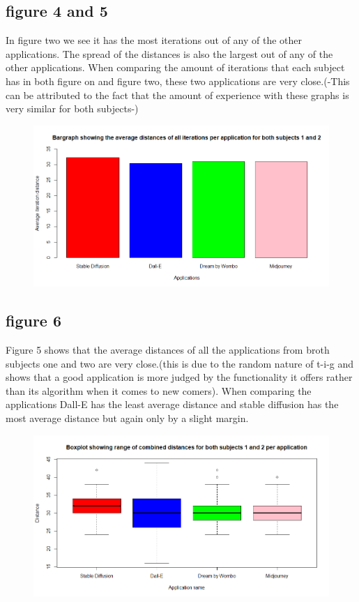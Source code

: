 \documentclass[]{report}
\begin{document}
\subsection{figure 4 and 5}

In figure two we see it has the most iterations out of any of the other applications. The spread of the distances is also the largest out of any of the other applications. When comparing the amount of iterations that each subject has in both figure on and figure two, these two applications are very close.(-This can be attributed to the fact that the amount of experience with these graphs is very similar for both subjects-)



\begin{figure}[!htbp]
	\centering
	\includegraphics[width=1\linewidth]{Bargraph}
	\caption{}
	\label{fig:bargraph}
\end{figure}
\subsection{figure 6}
Figure 5 shows that the average distances of all the applications from broth subjects one and two are very close.(this is due to the random nature of t-i-g and shows that a good application is more judged by the functionality it offers rather than its algorithm when it comes to new comers). When comparing the applications Dall-E has the least average distance and stable diffusion has the most average distance but again only by a slight margin. 
	
	\begin{figure}[!htbp]
		\centering
		\includegraphics[width=1\linewidth]{boxplotWithAllData}
		\caption{}
		\label{fig:boxplotwithalldata}
	\end{figure}
\end{document}
